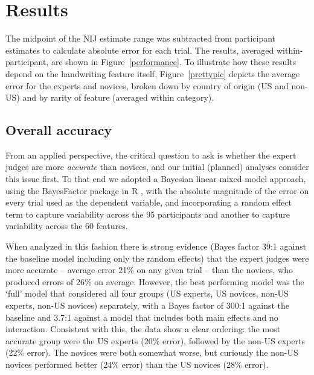 \documentclass[doc]{apa6} %
\begin{document}
\section{Results}

The midpoint of the NIJ estimate range was subtracted from participant estimates to calculate absolute error for each trial. The results, averaged within-participant, are shown in Figure~\ref{performance}. To illustrate how these results depend on the handwriting feature itself, Figure~\ref{prettypic} depicts the average error for the experts and novices, broken down by country of origin (US and non-US) and by rarity of feature (averaged within category).

\subsection{Overall accuracy}

From an applied perspective, the critical question to ask is whether the expert judges are more {\it accurate} than novices, and our initial (planned) analyses consider this issue first. To that end we adopted a Bayesian linear mixed model approach, using the BayesFactor package in R \cite{morey2015}, with the absolute magnitude of the error on every trial used as the dependent variable, and incorporating a random effect term to capture variability across the 95 participants and another to capture variability across the 60 features.

When analyzed in this fashion there is strong evidence (Bayes factor 39:1 against the baseline model including only the random effects) that the expert judges were more accurate -- average error 21\% on any given trial -- than the novices, who produced errors of 26\% on average. However, the best performing model was the `full' model that considered all four groups (US experts, US novices, non-US experts, non-US novices) separately, with a Bayes factor of 300:1 against the baseline and 3.7:1 against a model that includes both main effects and no interaction. Consistent with this, the data show a clear ordering: the most accurate group were the US experts (20\% error), followed by the non-US experts (22\% error). The novices were both somewhat worse, but curiously the non-US novices performed better (24\% error) than the US novices (28\% error).
\end{document}
